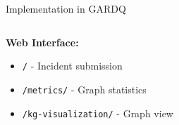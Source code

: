 \documentclass[10pt, aspectratio=169]{beamer}
\begin{document}
\begin{frame}{Implementation in GARDQ}
\begin{columns}[T]
\begin{column}{0.5\textwidth}
            \textbf{Web Interface:}
            \begin{itemize}
                \footnotesize
                \item \texttt{/} - Incident submission
                \item \texttt{/metrics/} - Graph statistics
                \item \texttt{/kg-visualization/} - Graph view
            \end{itemize}
        \end{column}
    \end{columns}
\end{frame}
\end{document}

